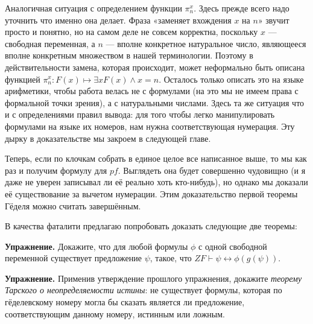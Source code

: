 Аналогичная ситуация с определением функции $\pi^x_n$. Здесь прежде всего надо уточнить что именно она делает. Фраза «заменяет вхождения $x$ на $n$» звучит просто и понятно, но на самом деле не совсем корректна, поскольку $x$ — свободная переменная, а $n$ — вполне конкретное натуральное число, являющееся вполне конкретным множеством в нашей терминологии. Поэтому в действительности замена, которая происходит, может неформально быть описана функцией $\pi^x_n: F(x)\mapsto \exists x F(x)\wedge x=n$. Осталось только описать это на языке арифметики, чтобы работа велась не с формулами (на это мы не имеем права с формальной точки зрения), а с натуральными числами. Здесь та же ситуация что и с определениями правил вывода: для того чтобы легко манипулировать формулами на языке их номеров, нам нужна соответствующая нумерация. Эту дырку в доказательстве мы закроем в следующей главе.

Теперь, если по клочкам собрать в единое целое все написанное выше, то мы как раз и получим формулу для $pf$. Выглядеть она будет совершенно чудовищно (и я даже не уверен записывал ли её реально хоть кто-нибудь), но однако мы доказали её существование за вычетом нумерации. Этим доказательство первой теоремы Гёделя можно считать завершённым.

В качества фаталити предлагаю попробовать доказать следующие две теоремы:

{\bfseries Упражнение.} Докажите, что для любой формулы $\phi$ с одной свободной переменной существует предложение $\psi$, такое, что $ZF\vdash \psi \leftrightarrow \phi(g(\psi))$.

{\bfseries Упражнение.} Применив утверждение прошлого упражнения, докажите {\slshape теорему Тарского о неопределяемости истины}: не существует формулы, которая по гёделевскому номеру могла бы сказать является ли предложение, соответствующим данному номеру, истинным или ложным.
